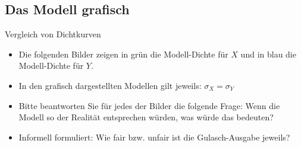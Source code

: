 \documentclass[usenames,dvipsnames,handout]{beamer}
\begin{document}
\subsection{Das Modell grafisch}

\begin{frame}{Vergleich von Dichtkurven}
\begin{itemize}
\item{Die folgenden Bilder zeigen in grün die Modell-Dichte für $X$ und in blau
die Modell-Dichte für $Y.$}
\item{In den grafisch dargestellten Modellen gilt jeweils: $\sigma_{X}=\sigma_{Y}$}
\item{Bitte beantworten Sie für jedes der Bilder die folgende Frage: 
Wenn die Modell so der Realität entsprechen würden, was würde das bedeuten?}
\item{Informell formuliert: Wie fair bzw. unfair ist die Gulasch-Ausgabe jeweils?}
\end{itemize}
\end{frame}
\end{document}
